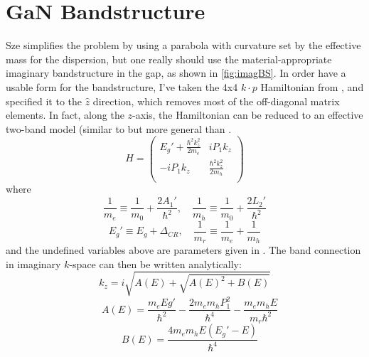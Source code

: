 \section{GaN Bandstructure}
Sze simplifies the problem by using a parabola with curvature set by the effective mass for the dispersion, but one really should use the material-appropriate imaginary bandstructure in the gap, as shown in \ref{fig:imagBS}.  In order have a usable form for the bandstructure, I've taken the 4x4 $k\cdot p$ Hamiltonian from \cite{Rinke_2008}, and specified it to the $\hat{z}$ direction, which removes most of the off-diagonal matrix elements.  In fact, along the $z$-axis, the Hamiltonian can be reduced to an effective two-band model (similar to but more general than \cite{Kane_1960}.
\[
  H=\begin{pmatrix}
    E_g'+\frac{\hbar^2k_z^2}{2m_e} & iP_1k_z\\
    -iP_1k_z & \frac{\hbar^2k_z^2}{2m_h} \\
  \end{pmatrix}
\]
where
\[\frac{1}{m_e}\equiv\frac{1}{m_0}+\frac{2A_1'}{\hbar^2},
\quad \frac{1}{m_h}\equiv\frac{1}{m_0}+\frac{2L_2'}{\hbar^2}
\]
\[
  E_g'\equiv E_g+\Delta_{CR}, \quad
\frac{1}{m_r}\equiv\frac{1}{m_e}+\frac{1}{m_h}
\]
and the undefined variables above are parameters given in \cite{Rinke_2008}.  The band connection in imaginary $k$-space can then be written analytically:
$$k_z=i\sqrt{A(E)+\sqrt{A(E)^2+B(E)}}$$
$$\quad A(E)=\frac{m_eEg'}{\hbar^2}-\frac{2m_em_hP_1^2}{\hbar^4}-\frac{m_em_hE}{m_r\hbar^2}$$
$$\quad B(E)=\frac{4m_em_hE(E_g'-E)}{\hbar^4}$$


